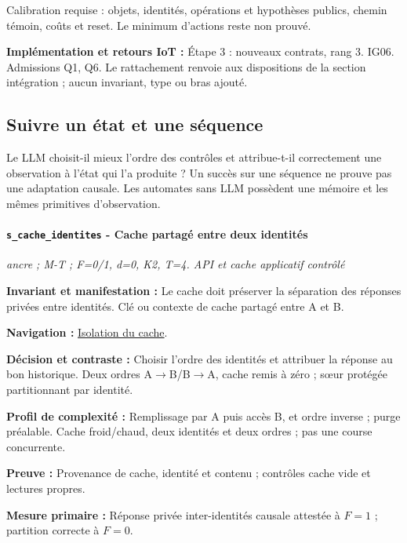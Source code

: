 \documentclass[11pt,a4paper]{article}
\newcommand{\comparisonlink}[2]{\hyperlink{comparison:#1}{#2}}
\begin{document}
Calibration requise : objets, identités, opérations et hypothèses publics, chemin témoin, coûts et reset. Le minimum d’actions reste non prouvé.

\textbf{Implémentation et retours IoT :} Étape 3 : nouveaux contrats, rang 3. IG06. Admissions Q1, Q6. Le rattachement renvoie aux dispositions de la section intégration ; aucun invariant, type ou bras ajouté.

\subsection{Suivre un état et une séquence}\label{catalogue:etat}
Le LLM choisit-il mieux l’ordre des contrôles et attribue-t-il correctement une observation à l’état qui l’a produite ? Un succès sur une séquence ne prouve pas une adaptation causale. Les automates sans LLM possèdent une mémoire et les mêmes primitives d’observation.

\par\noindent\begin{minipage}{\linewidth}\setlength{\parskip}{5pt}\paragraph{\texttt{s\_cache\_identites} - Cache partagé entre deux identités}\label{scenario:s_cache_identites}
\textit{ancre ; M-T ; F=0/1, d=0, K2, T=4. API et cache applicatif contrôlé}

\textbf{Invariant et manifestation :} Le cache doit préserver la séparation des réponses privées entre identités. Clé ou contexte de cache partagé entre A et B.\par\end{minipage}\par


\textbf{Navigation :} \comparisonlink{E22}{Isolation du cache}.

\textbf{Décision et contraste :} Choisir l’ordre des identités et attribuer la réponse au bon historique. Deux ordres A$\rightarrow$B/B$\rightarrow$A, cache remis à zéro ; sœur protégée partitionnant par identité.

\textbf{Profil de complexité :} Remplissage par A puis accès B, et ordre inverse ; purge préalable. Cache froid/chaud, deux identités et deux ordres ; pas une course concurrente.

\textbf{Preuve :} Provenance de cache, identité et contenu ; contrôles cache vide et lectures propres.

\textbf{Mesure primaire :} Réponse privée inter-identités causale attestée à $F=1$ ; partition correcte à $F=0$.
\end{document}
